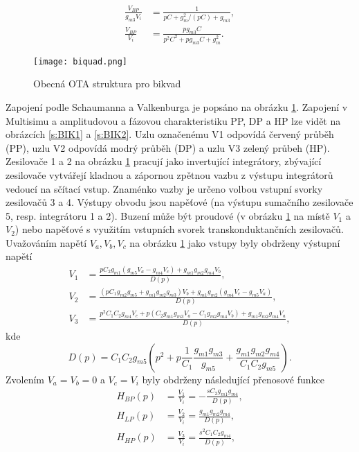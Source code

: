 \begin{align}
\frac{V_{BP}}{g_{m3}V_i} &= \frac{1}{pC + g_m^2/(pC) + g_{m3}},\\
\frac{V_{BP}}{V_i} &= \frac{pg_{m3}C}{p^2C^2 + pg_{m3}C + g_m^2}.
\end{align}
\begin{figure}[h]
\centering
\texttt{[image: biquad.png]}
\caption[Obecná OTA struktura pro bikvad]{Obecná OTA struktura pro bikvad \label{s:BIK}}
\end{figure}
\noindent Zapojení podle Schaumanna a Valkenburga \cite{13} je popsáno na obrázku \ref{s:BIK}. Zapojení v Multisimu a amplitudovou a fázovou charakteristiku PP, DP a HP lze vidět na obrázcích \ref{s:BIK1} a \ref{s:BIK2}. Uzlu označenému V1 odpovídá červený průběh (PP), uzlu V2 odpovídá modrý průběh (DP) a uzlu V3 zelený průbeh (HP). Zesilovače 1 a 2 na obrázku \ref{s:BIK} pracují jako invertující integrátory, zbývající zesilovače vytvářejí kladnou a zápornou zpětnou vazbu z výstupu integrátorů vedoucí na sčítací vstup. Znaménko vazby je určeno volbou vstupní svorky zesilovačů 3 a 4. Výstupy obvodu jsou napěťové (na výstupu sumačního zesilovače 5, resp. integrátoru 1 a 2). Buzení může být proudové (v obrázku \ref{s:BIK} na místě $V_1$ a $V_2$) nebo napěťové s využitím vstupních svorek transkonduktančních zesilovačů. Uvažováním napětí $V_a, V_b, V_c$ na obrázku \ref{s:BIK} jako vstupy byly obdrženy výstupní napětí
\begin{align}
V_1 &= \frac{pC_2g_{m1}(g_{m5}V_a - g_{m4}V_c) + g_{m1}g_{m2}g_{m4}V_b}{D(p)},\\
V_2 &= \frac{(pC_1g_{m2}g_{m5} + g_{m1}g_{m2}g_{m3})V_b + g_{m1}g_{m2}(g_{m4}V_c - g_{m5}V_a)}{D(p)},\\
V_3 &= \frac{p^2C_1C_2g_{m4}V_c + p(C_2g_{m1}g_{m3}V_a - C_1g_{m2}g_{m4}V_b) + g_{m1}g_{m2}g_{m4}V_a}{D(p)},
\end{align}\label{s:V3}
kde
\begin{equation}
D(p) = C_1C_2g_{m5}(p^2 + p\frac{1}{C_1}\frac{g_{m1}g_{m3}}{g_{m5}} + \frac{g_{m1}g_{m2}g_{m4}}{C_1C_2g_{m5}}).
\end{equation}\label{s:DS}
\noindent Zvolením $V_a = V_b = 0$ a $V_c = V_i$ byly obdrženy následující přenosové funkce
\begin{align}
H_{BP}(p) &= \frac{V_1}{V_i} = - \frac{sC_2g_{m1}g_{m4}}{D(p)},\\
H_{LP}(p) &= \frac{V_2}{V_i} = \frac{g_{m1}g_{m2}g_{m4}}{D(p)},\\
H_{HP}(p) &= \frac{V_3}{V_i} = \frac{s^2C_1C_2g_{m4}}{D(p)},
\end{align}
